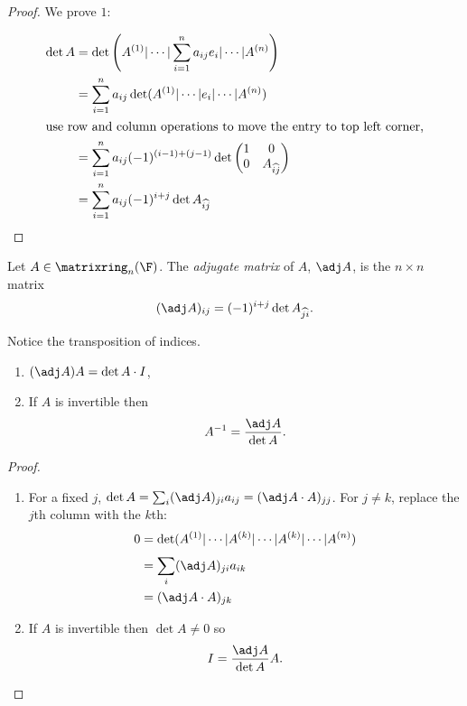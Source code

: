 \documentclass[a4paper]{article}
\newcommand*{\M}{\matrixring}
\theoremstyle{definition}
\begin{document}
\begin{proof}
  We prove \(1\):
  
  \begin{align*}
    \det A &= \det \left( A^{(1)} | \cdots | \sum_{i = 1}^{n} a_{ij}e_i | \cdots | A^{(n)} \right) \\
           &= \sum_{i = 1}^{n} a_{ij} \det( A^{(1)} | \cdots | e_i | \cdots | A^{(n)} ) \\
    \intertext{use row and column operations to move the entry to top left corner,}
           &= \sum_{i = 1}^{n} a_{ij} (-1)^{(i - 1) + (j - 1)} \det
             \begin{pmatrix}
               1 & 0 \\
               0 & A_{\widehat{ij}}
             \end{pmatrix} \\
           &= \sum_{i = 1}^{n} a_{ij} (-1)^{i + j} \det A_{\widehat{ij}}
  \end{align*}
\end{proof}

\begin{definition}[Adjugate]
  Let \(A \in \M_n(\F)\). The \emph{adjugate matrix} of \(A\), \(\adj A\), is the \(n \times n\) matrix
  \[
    (\adj A)_{ij} = (-1)^{i + j} \det A_{\widehat{ji}}.
  \]
\end{definition}

Notice the transposition of indices.

\begin{theorem}\leavevmode
  \begin{enumerate}
  \item \((\adj A ) A = \det A \cdot I\),
  \item If \(A\) is invertible then
    \[
      A^{-1} = \frac{\adj A}{\det A}.
    \]
  \end{enumerate}
\end{theorem}

\begin{proof}\leavevmode
  \begin{enumerate}
  \item For a fixed \(j\), \(\det A = \sum_i (\adj A)_{ji} a_{ij} = (\adj A \cdot A)_{jj}\). For \(j \neq k\), replace the \(j\)th column with the \(k\)th:
    \begin{align*}
      0 &= \det(A^{(1)} | \cdots | A^{(k)} | \cdots | A^{(k)} | \cdots | A^{(n)}) \\
        &= \sum_{i}^{ } (\adj A)_{ji} a_{ik} \\
        &= (\adj A \cdot A)_{jk}
    \end{align*}
  \item If \(A\) is invertible then \(\det A \neq 0\) so
    \[
      I = \frac{\adj A}{\det A} A.
    \]
  \end{enumerate}
\end{proof}
\end{document}
